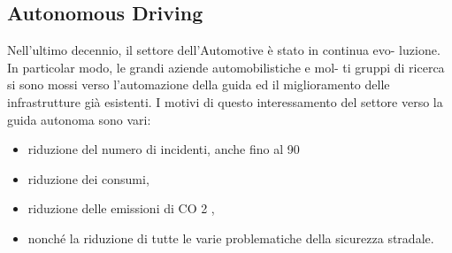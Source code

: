 \documentclass[14pt]{extarticle}
\begin{document}
\subsection{Autonomous Driving}
Nell’ultimo decennio, il settore dell’Automotive è stato in continua evo-
luzione. In particolar modo, le grandi aziende automobilistiche e mol-
ti gruppi di ricerca si sono mossi verso l’automazione della guida ed
il miglioramento delle infrastrutture già esistenti. I motivi di questo
interessamento del settore verso la guida autonoma sono vari:
\begin{itemize}
\item riduzione del numero di incidenti, anche fino al 90%
\item  riduzione dei consumi,
\item  riduzione delle emissioni di CO 2 ,
\item  nonché la riduzione di tutte le varie problematiche della sicurezza
stradale.

\end{itemize}
\end{document}
